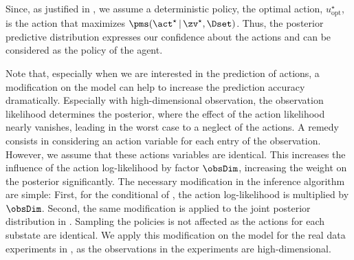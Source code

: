 \documentclass{article}
\begin{document}
Since, as justified in , we assume a deterministic policy, the optimal action, $u^\star_\text{opt}$, is the action that maximizes $\pms(\act^\star \,|\, \zv^\star, \Dset)$. Thus, the posterior predictive distribution expresses our confidence about the actions and can be considered as the policy of the agent.

Note that, especially when we are interested in the prediction of actions, a modification on the model can help to increase the prediction accuracy dramatically.
Especially with high-dimensional observation, the observation likelihood determines the posterior, where the effect of the action likelihood nearly vanishes, leading in the worst case to a neglect of the actions.
A remedy consists in considering an action variable for each entry of the observation.
However, we assume that these actions variables are identical.
This increases the influence of the action log-likelihood by factor $\obsDim$, increasing the weight on the posterior significantly. 
The necessary modification in the inference algorithm are simple: First, for the conditional of , the action log-likelihood is multiplied by $\obsDim$.
Second, the same modification is applied to the joint posterior distribution in .
Sampling the policies is not affected as the actions for each substate are identical.
We apply this modification on the model for the real data experiments in , as the observations in the experiments are high-dimensional.
\end{document}

